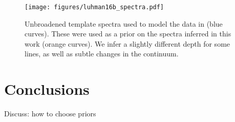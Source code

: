 \documentclass[modern]{aastex631}
\begin{document}
%
\begin{figure}[p!]
    \begin{centering}
        \texttt{[image: figures/luhman16b\_spectra.pdf]} %
        \caption{%
            Unbroadened template spectra used to model the data in \citet{Crossfield2014} (blue curves). These were used as a prior on the spectra inferred in this work (orange curves). We infer a slightly different depth for some lines, as well as subtle changes in the continuum.
        }
        \label{fig:luhman16b:template_spectra}
    \end{centering}
\end{figure}

\section{Conclusions}
\label{sec:conclusions}
%

Discuss: how to choose priors



%
%
%
%
\clearpage
\appendix
%
%
%
%
\end{document}
